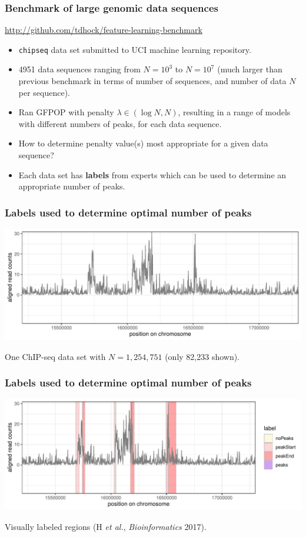 \documentclass[t]{beamer}
\begin{document}
\begin{frame}
  \frametitle{Benchmark of large genomic data sequences}

\url{http://github.com/tdhock/feature-learning-benchmark}

\begin{itemize}
\item \texttt{chipseq} data set submitted to UCI machine learning
  repository.
\item 4951 data sequences ranging from $N=10^3$ to $N=10^7$ (much
  larger than previous benchmark in terms of number of sequences, and
  number of data $N$ per sequence).
\item Ran GFPOP with penalty $\lambda\in(\log N, N)$, resulting in a
  range of models with different numbers of peaks, for each data
  sequence.
\item How to determine penalty value(s) most appropriate for a given
  data sequence?
\item Each data set has \textbf{labels} from experts which can be used
  to determine an appropriate number of peaks.
\end{itemize}
\end{frame}

\begin{frame}
  \frametitle{Labels used to determine optimal number of peaks}
  \includegraphics[width=\textwidth]{jss-figure-label-error-data}
  
  One ChIP-seq data set with $N=1,254,751$ (only 82,233 shown).
\end{frame}

\begin{frame}
  \frametitle{Labels used to determine optimal number of peaks}
  \includegraphics[width=\textwidth]{jss-figure-label-error-data-labels}

  Visually labeled regions (H {\it et al.}, {\it Bioinformatics} 2017). 
\end{frame}
\end{document}
